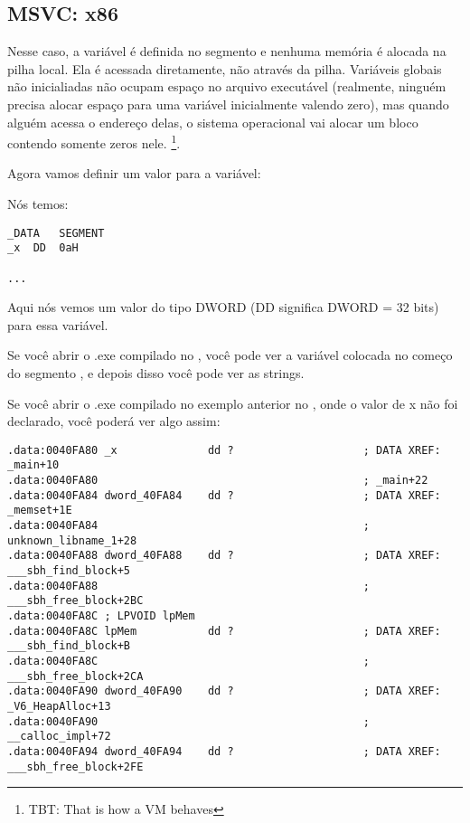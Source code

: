 \subsection{MSVC: x86}



Nesse caso, a variável  é definida no segmento  e nenhuma memória é alocada na pilha local.
Ela é acessada diretamente, não através da pilha.
Variáveis globais não inicialiadas não ocupam espaço no arquivo executável 
(realmente, ninguém precisa alocar espaço para uma variável inicialmente valendo zero), 
mas quando alguém acessa o endereço delas, o sistema operacional vai alocar um bloco contendo somente zeros nele.
\footnote{\ac{TBT}: That is how a \ac{VM} behaves}.

Agora vamos definir um valor para a variável:



Nós temos:

\begin{lstlisting}
_DATA	SEGMENT
_x	DD	0aH

...
\end{lstlisting}

Aqui nós vemos um valor  do tipo DWORD (DD significa DWORD = 32 bits) para essa variável.

Se você abrir o .exe compilado no \IDA, você pode ver a variável  colocada no começo do segmento ,
e depois disso você pode ver as strings.

Se você abrir o .exe compilado no exemplo anterior no \IDA, onde o valor de x não foi declarado, você poderá ver algo assim:

\begin{lstlisting}
.data:0040FA80 _x              dd ?                    ; DATA XREF: _main+10
.data:0040FA80                                         ; _main+22
.data:0040FA84 dword_40FA84    dd ?                    ; DATA XREF: _memset+1E
.data:0040FA84                                         ; unknown_libname_1+28
.data:0040FA88 dword_40FA88    dd ?                    ; DATA XREF: ___sbh_find_block+5
.data:0040FA88                                         ; ___sbh_free_block+2BC
.data:0040FA8C ; LPVOID lpMem
.data:0040FA8C lpMem           dd ?                    ; DATA XREF: ___sbh_find_block+B
.data:0040FA8C                                         ; ___sbh_free_block+2CA
.data:0040FA90 dword_40FA90    dd ?                    ; DATA XREF: _V6_HeapAlloc+13
.data:0040FA90                                         ; __calloc_impl+72
.data:0040FA94 dword_40FA94    dd ?                    ; DATA XREF: ___sbh_free_block+2FE
\end{lstlisting}

